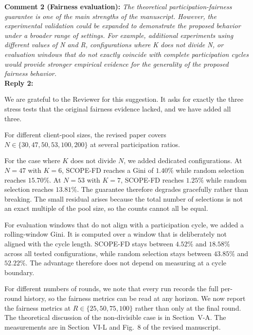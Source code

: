 \documentclass[10pt]{article}
\begin{document}
\noindent
\textbf{Comment 2 (Fairness evaluation):} \textit{The theoretical participation-fairness guarantee is one of the main strengths of the manuscript. However, the experimental validation could be expanded to demonstrate the proposed behavior under a broader range of settings. For example, additional experiments using different values of N and R, configurations where K does not divide N, or evaluation windows that do not exactly coincide with complete participation cycles would provide stronger empirical evidence for the generality of the proposed fairness behavior.} \\
\noindent
\textbf{Reply 2:} {We are grateful to the Reviewer for this suggestion. It asks for exactly the three stress tests that the original fairness evidence lacked, and we have added all three.

For different client-pool sizes, the revised paper covers $N \in \{30, 47, 50, 53, 100, 200\}$ at several participation ratios.

For the case where $K$ does not divide $N$, we added dedicated configurations. At $N = 47$ with $K = 6$, SCOPE-FD reaches a Gini of $1.40\%$ while random selection reaches $15.70\%$. At $N = 53$ with $K = 7$, SCOPE-FD reaches $1.25\%$ while random selection reaches $13.81\%$. The guarantee therefore degrades gracefully rather than breaking. The small residual arises because the total number of selections is not an exact multiple of the pool size, so the counts cannot all be equal.

For evaluation windows that do not align with a participation cycle, we added a rolling-window Gini. It is computed over a window that is deliberately not aligned with the cycle length. SCOPE-FD stays between $4.52\%$ and $18.58\%$ across all tested configurations, while random selection stays between $43.85\%$ and $52.22\%$. The advantage therefore does not depend on measuring at a cycle boundary.

For different numbers of rounds, we note that every run records the full per-round history, so the fairness metrics can be read at any horizon. We now report the fairness metrics at $R \in \{25, 50, 75, 100\}$ rather than only at the final round. The theoretical discussion of the non-divisible case is in Section~V-A. The measurements are in Section~VI-L and Fig.~8 of the revised manuscript.}\\
\end{document}
